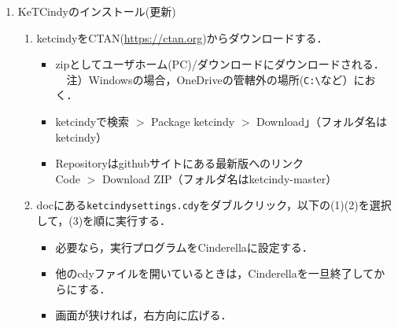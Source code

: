 \documentclass{ujarticle}
\begin{document}
\begin{enumerate}[\bf\large 1.]
\item KeTCindyのインストール(更新)\vspace{-2mm}
  \begin{enumerate}[(1)]
  \item ketcindyをCTAN(\url{https://ctan.org})からダウンロードする．
    \begin{itemize}
     \item zipとしてユーザホーム(PC)/ダウンロードにダウンロードされる．\\
　注）Windowsの場合，OneDriveの管轄外の場所(\verb|C:\|など）におく．
     \item ketcindyで検索 $>$ Package ketcindy $>$ Download」（フォルダ名はketcindy）
     \item Repositoryはgithubサイトにある{\color{red}最新版}へのリンク\\
        \hspace*{10mm}Code $>$ Download ZIP（フォルダ名はketcindy-master）
     \end{itemize}
  \item docにある\verb|ketcindysettings.cdy|をダブルクリック，以下の(1)(2)を選択して，(3)を順に実行する．
    \begin{itemize}
    \item 必要なら，実行プログラムをCinderellaに設定する．
    \item 他のcdyファイルを開いているときは，Cinderellaを一旦終了してからにする．
   \item 画面が狭ければ，右方向に広げる．
   \end{itemize}
  \end{enumerate}



\end{enumerate}
\end{document}
